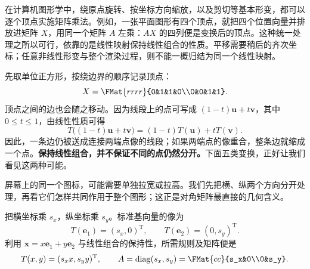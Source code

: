 \documentclass[a4paper,12pt,twoside,openany,fontset=none]{ctexbook}
\renewcommand{\leq}{\leqslant}
\numberwithin{equation}{chapter}
\begin{document}
在计算机图形学中，绕原点旋转、按坐标方向缩放，以及剪切等基本形变，都可以逐个顶点实施矩阵乘法。例如，一张平面图形有四个顶点，就把四个位置向量并排放进矩阵 $X$，用同一个矩阵 $A$ 左乘：$AX$ 的四列便是变换后的顶点。这种统一处理之所以可行，依靠的是线性映射保持线性组合的性质。平移需要稍后的齐次坐标；任意非线性形变与整个渲染过程，则不能一概归结为同一个线性映射。

先取单位正方形，按绕边界的顺序记录顶点：
\[
 X=\FMat{rrrr}{0&1&1&0\\0&0&1&1}.
\]
顶点之间的边也会随之移动。因为线段上的点可写成 $(1-t)\boldsymbol u+t\boldsymbol v$，其中 $0\leq t\leq1$，由线性性质可得
\[
 T\bigl((1-t)\boldsymbol u+t\boldsymbol v\bigr)
 =(1-t)T(\boldsymbol u)+tT(\boldsymbol v).
\]
因此，一条边仍被送成连接两端点像的线段；如果两端点的像重合，整条边就缩成一个点。\textbf{保持线性组合，并不保证不同的点仍然分开。}下面五类变换，正好让我们看见这两种可能。


屏幕上的同一个图标，可能需要单独拉宽或拉高。我们先把横、纵两个方向分开处理，再看它们怎样共同作用于整个图形；这正是对角矩阵最直接的几何含义。

把横坐标乘 $s_x$，纵坐标乘 $s_y$。标准基向量的像为
\[
 T(\boldsymbol e_1)=(s_x,0)^{\mathrm T},\qquad
 T(\boldsymbol e_2)=(0,s_y)^{\mathrm T}.
\]
利用 $\boldsymbol x=x\boldsymbol e_1+y\boldsymbol e_2$ 与线性组合的保持性，所需规则及矩阵便是
\[
 T(x,y)=(s_xx,s_yy)^{\mathrm T},\qquad
 A=\operatorname{diag}(s_x,s_y)=\FMat{cc}{s_x&0\\0&s_y}.
\]
\end{document}
